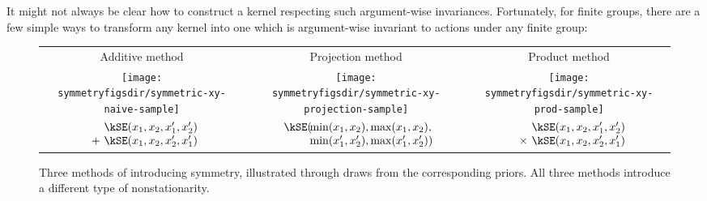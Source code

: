 It might not always be clear how to construct a kernel respecting such argument-wise invariances.
Fortunately, for finite groups, there are a few simple ways to transform any kernel into one which is argument-wise invariant to actions under any finite group:
%
%
\begin{figure}
\renewcommand{\tabcolsep}{1.5mm}
\begin{tabular}{ccc}
Additive method & Projection method & Product method \\[0.5ex]
\texttt{[image: \\symmetryfigsdir/symmetric-xy-naive-sample]} &
\texttt{[image: \\symmetryfigsdir/symmetric-xy-projection-sample]} &
\texttt{[image: \\symmetryfigsdir/symmetric-xy-prod-sample]}\\
$\begin{array}{r@{}l@{}}
& \kSE(x_1, x_2, x_1', x_2') \\ + \,\, & \kSE(x_1, x_2, x_2', x_1')
\end{array}$
&
$\begin{array}{r@{}l@{}}
\kSE( \!\! &{}\min(x_1, x_2), \max(x_1, x_2), \\
           &{}\min(x_1', x_2'), \max(x_1',x_2') )
\end{array}$
&
$\begin{array}{r@{}l@{}}
& \kSE(x_1, x_2, x_1', x_2') \\ \times \,\, & \kSE(x_1, x_2, x_2', x_1')
\end{array}$
\end{tabular}
\caption[Three ways to introduce symmetry]{Three methods of introducing symmetry, illustrated through draws from the corresponding priors.
All three methods introduce a different type of nonstationarity.
}
\label{fig:add_vs_min}
\end{figure}
%
